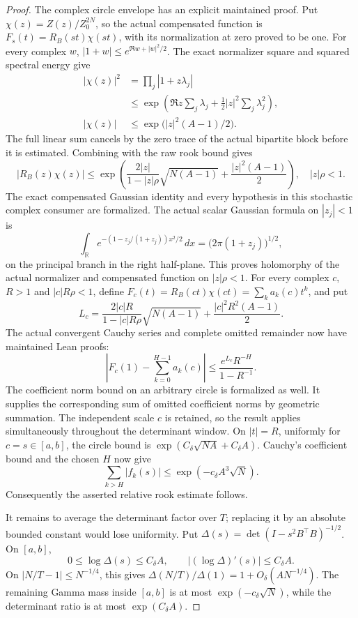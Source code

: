 \begin{proof}
The complex circle envelope has an explicit maintained proof.
Put \(\chi(z)=Z(z)/Z_0^{2N}\), so the actual compensated function is
\(F_s(t)=R_B(st)\chi(st)\), with its normalization at zero proved to be one.
For every complex \(w\), \(|1+w|\leq e^{\Re w+|w|^2/2}\).
The exact normalizer square and squared spectral energy give
\[
 \begin{split}
 |\chi(z)|^2&=\prod_j|1+z\lambda_j|\\
 &\leq\exp\!\left(\Re z\sum_j\lambda_j+
                             \tfrac12|z|^2\sum_j\lambda_j^2\right),\\
 |\chi(z)|&\leq\exp\bigl(|z|^2(A-1)/2\bigr).
 \end{split}
\]
The full linear sum cancels by the zero trace of the actual bipartite
block before it is estimated. Combining with the raw rook bound gives
\[
 \boxed{\quad |R_B(z)\chi(z)|
 \leq\exp\!\left(\frac{2|z|}{1-|z|\rho}\sqrt{N(A-1)}
                                +\frac{|z|^2(A-1)}2\right),
 \quad |z|\rho<1.\quad}
\]
The exact compensated Gaussian identity and every hypothesis in this
stochastic complex consumer are formalized.
The actual scalar Gaussian formula on \(|z_j|<1\) is
\[
 \int_{\mathbb R}e^{-(1-z_j/(1+z_j))x^2/2}\,dx
                    =\bigl(2\pi(1+z_j)\bigr)^{1/2},
\]
on the principal branch in the right half-plane. This proves holomorphy
of the actual normalizer and compensated function on \(|z|\rho<1\).
For every complex \(c\), \(R>1\) and \(|c|R\rho<1\), define
\(F_c(t)=R_B(ct)\chi(ct)=\sum_k a_k(c)t^k\), and put
\[
 L_c=\frac{2|c|R}{1-|c|R\rho}\sqrt{N(A-1)}
                              +\frac{|c|^2R^2(A-1)}2 .
\]
The actual convergent Cauchy series and complete omitted remainder
now have maintained Lean proofs:
\[
 \left|F_c(1)-\sum_{k=0}^{H-1}a_k(c)\right|
                 \leq\frac{e^{L_c}R^{-H}}{1-R^{-1}} .
\]
The coefficient norm bound on an arbitrary circle is formalized as
well. It supplies the corresponding sum of omitted coefficient norms
by geometric summation. The independent scale \(c\) is retained, so
the result applies simultaneously throughout the determinant window.
On \(|t|=R\), uniformly for \(c=s\in[a,b]\), the circle bound is
\(\exp(C_\delta\sqrt{NA}+C_\delta A)\).
Cauchy's coefficient bound and the chosen \(H\) now give
\[
 \sum_{k>H}|f_k(s)|
       \leq\exp(-c_\delta A^3\sqrt N).
\]
Consequently the asserted relative rook estimate follows.

It remains to average the determinant factor over \(T\);
replacing it by an absolute bounded constant would lose
uniformity. Put
\(\Delta(s)=\det(I-s^2B^\top B)^{-1/2}\).
On \([a,b]\),
\[
 0\leq\log\Delta(s)\leq C_\delta A,\qquad
 |(\log\Delta)'(s)|\leq C_\delta A .
\]
On \(|N/T-1|\leq N^{-1/4}\), this gives
\(\Delta(N/T)/\Delta(1)=1+O_\delta(AN^{-1/4})\).
The remaining Gamma mass inside \([a,b]\) is at most
\(\exp(-c_\delta\sqrt N)\), while the determinant ratio is
at most \(\exp(C_\delta A)\).


\end{proof}

